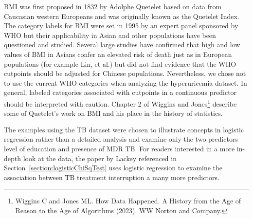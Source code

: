 BMI was first proposed in 1832 by Adolphe Quetelet based on data from Caucasian western Europeans and was originally known as the Quetelet Index. The category labels for BMI were set in 1995 by an expert panel sponsored by WHO but their applicability in Asian and other populations have been questioned and studied.  Several large studies have confirmed that high and low values of BMI in Asians confer an elevated risk of death just as in European populations (for example Lin, et al.) but did not find evidence that the WHO cutpoints should be adjusted for Chinese populations.   Nevertheless, we chose not to use the current WHO categories when analyzing the hyperuricemia dataset.  In general, labeled categories associated with cutpoints in a continuous predictor should be interpreted with caution.  Chapter 2 of Wiggins and Jones\footnote{Wiggins C and Jones ML.  How Data Happened.  A History from the Age of Reason to the Age of Algorithms (2023).  WW Norton and Company.} describe some of Quetelet's work on BMI and his place in the history of statistics.

The examples using the TB dataset were chosen to illustrate concepts in logistic regression rather than a detailed analysis and examine only the two predictors level of education and presence of MDR TB.  For readers interested in a more in-depth look at the data, the paper by Lackey referenced in Section~\ref{section:logisticChiSqTest} uses logistic regression to examine the association between TB treatment interruption a many more predictors.
